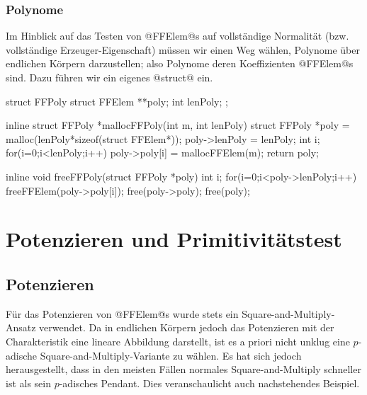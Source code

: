 \subsubsection{Polynome}
Im Hinblick auf das Testen von @FFElem@s auf vollständige Normalität 
(bzw. vollständige Erzeuger-Eigenschaft) müssen wir einen Weg wählen, Polynome
über endlichen Körpern darzustellen; also Polynome deren Koeffizienten 
@FFElem@s sind. Dazu führen wir ein eigenes @struct@ ein.

\begin{ccode}[caption={Aus \url{../Sage/enumeratePCNs.c}}]
struct FFPoly{
    struct FFElem **poly;
    int lenPoly;
};
\end{ccode}


\begin{ccode}[caption={Aus \url{../Sage/enumeratePCNs.c}}]
inline struct FFPoly *mallocFFPoly(int m, int lenPoly){
    struct FFPoly *poly = malloc(lenPoly*sizeof(struct FFElem*));
    poly->lenPoly = lenPoly;
    int i;
    for(i=0;i<lenPoly;i++) poly->poly[i] = mallocFFElem(m);
    return poly;
}
\end{ccode}  

\begin{ccode}[caption={Aus \url{../Sage/enumeratePCNs.c}}]
inline void freeFFPoly(struct FFPoly *poly){
    int i;
    for(i=0;i<poly->lenPoly;i++) freeFFElem(poly->poly[i]);
    free(poly->poly);
    free(poly);
}
\end{ccode}  


\section{Potenzieren und Primitivitätstest}

\subsection{Potenzieren}
Für das Potenzieren von @FFElem@s wurde stets ein Square-and-Multiply-Ansatz
verwendet. Da in endlichen Körpern jedoch das Potenzieren mit der
Charakteristik eine lineare Abbildung darstellt, ist es a priori nicht unklug
eine $p$-adische Square-and-Multiply-Variante zu wählen. Es hat sich jedoch
herausgestellt, dass in den meisten Fällen normales Square-and-Multiply
schneller ist als sein $p$-adisches Pendant. Dies veranschaulicht auch
nachstehendes Beispiel.

